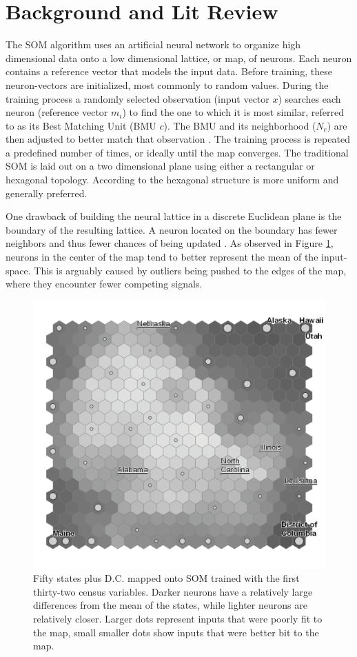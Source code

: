 \documentclass[10pt,titlepage]{article}
\begin{document}
\section{Background and Lit Review}
The SOM algorithm uses an artificial neural network to organize high dimensional
data onto a low dimensional lattice, or map, of neurons.  Each neuron contains a
reference vector that models the input data.  Before training, these
neuron-vectors are initialized, most commonly to random values.  During the
training process a randomly selected observation (input vector $x$) searches
each neuron (reference vector $m_i$) to find the one to which it is most
similar, referred to as its Best Matching Unit (BMU $c$).  The BMU and its
neighborhood ($N_c$) are then adjusted to better match that observation
\citep{Kohonen2000}.  The training process is repeated a predefined number of
times, or ideally until the map converges.  The traditional SOM is laid out on a
two dimensional plane using either a rectangular or hexagonal topology.
According to \cite{wu2006} the hexagonal structure is more uniform and generally
preferred.

One drawback of building the neural lattice in a discrete Euclidean plane is the
boundary of the resulting lattice.  A neuron located on the boundary has fewer
neighbors and thus fewer chances of being updated \citep{wu2006}.  As observed
in Figure \ref{figure1}, neurons in the center of the map tend to better
represent the mean of the input-space.  This is arguably caused by outliers
being pushed to the edges of the map, where they encounter fewer competing
signals.

\begin{figure}
\centering
\includegraphics[width=.6\linewidth]{gridedge_grey.pdf}
\caption{Fifty states plus D.C. mapped onto SOM trained with the first
thirty-two census variables.  Darker neurons have a relatively large differences
from the mean of the states, while lighter neurons are relatively closer.
Larger dots represent inputs that were poorly fit to the map, small smaller dots
show inputs that were better bit to the map.}
\label{figure1}
\end{figure}
\end{document}

